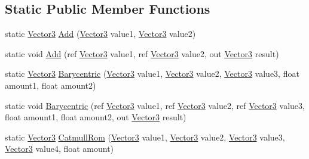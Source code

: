 \subsection*{Static Public Member Functions}
\begin{DoxyCompactItemize}
\item 
static \hyperlink{structMicrosoft_1_1Xna_1_1Framework_1_1Vector3}{Vector3} \hyperlink{structMicrosoft_1_1Xna_1_1Framework_1_1Vector3_a1e074fdb7e2303703c1c5f6566906738}{Add} (\hyperlink{structMicrosoft_1_1Xna_1_1Framework_1_1Vector3}{Vector3} value1, \hyperlink{structMicrosoft_1_1Xna_1_1Framework_1_1Vector3}{Vector3} value2)
\item 
static void \hyperlink{structMicrosoft_1_1Xna_1_1Framework_1_1Vector3_ad931a80d5b929420557fb494af735f95}{Add} (ref \hyperlink{structMicrosoft_1_1Xna_1_1Framework_1_1Vector3}{Vector3} value1, ref \hyperlink{structMicrosoft_1_1Xna_1_1Framework_1_1Vector3}{Vector3} value2, out \hyperlink{structMicrosoft_1_1Xna_1_1Framework_1_1Vector3}{Vector3} result)
\item 
static \hyperlink{structMicrosoft_1_1Xna_1_1Framework_1_1Vector3}{Vector3} \hyperlink{structMicrosoft_1_1Xna_1_1Framework_1_1Vector3_a0b19fb50647cc9c19f5c672e07010ad9}{Barycentric} (\hyperlink{structMicrosoft_1_1Xna_1_1Framework_1_1Vector3}{Vector3} value1, \hyperlink{structMicrosoft_1_1Xna_1_1Framework_1_1Vector3}{Vector3} value2, \hyperlink{structMicrosoft_1_1Xna_1_1Framework_1_1Vector3}{Vector3} value3, float amount1, float amount2)
\item 
static void \hyperlink{structMicrosoft_1_1Xna_1_1Framework_1_1Vector3_a0e41a5b3a63105f0338294fb31b5b7dc}{Barycentric} (ref \hyperlink{structMicrosoft_1_1Xna_1_1Framework_1_1Vector3}{Vector3} value1, ref \hyperlink{structMicrosoft_1_1Xna_1_1Framework_1_1Vector3}{Vector3} value2, ref \hyperlink{structMicrosoft_1_1Xna_1_1Framework_1_1Vector3}{Vector3} value3, float amount1, float amount2, out \hyperlink{structMicrosoft_1_1Xna_1_1Framework_1_1Vector3}{Vector3} result)
\item 
static \hyperlink{structMicrosoft_1_1Xna_1_1Framework_1_1Vector3}{Vector3} \hyperlink{structMicrosoft_1_1Xna_1_1Framework_1_1Vector3_a1048b129ec447fa6ee790dad103c3401}{Catmull\+Rom} (\hyperlink{structMicrosoft_1_1Xna_1_1Framework_1_1Vector3}{Vector3} value1, \hyperlink{structMicrosoft_1_1Xna_1_1Framework_1_1Vector3}{Vector3} value2, \hyperlink{structMicrosoft_1_1Xna_1_1Framework_1_1Vector3}{Vector3} value3, \hyperlink{structMicrosoft_1_1Xna_1_1Framework_1_1Vector3}{Vector3} value4, float amount)
\item 

\end{DoxyCompactItemize}
